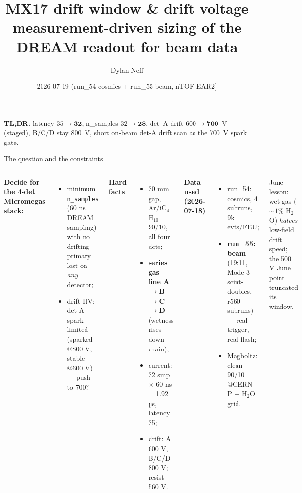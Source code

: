 \documentclass[10pt,aspectratio=169]{beamer}
\title{\textbf{MX17 drift window \& drift voltage}\\
\large measurement-driven sizing of the DREAM readout for beam data}
\author{Dylan Neff}
\date{2026-07-19 \quad (run\_54 cosmics + run\_55 beam, nTOF EAR2)}
\begin{document}
\begin{frame}
  \titlepage
  \vfill
  \centering\small
  \textbf{TL;DR:}\; latency $35\to\mathbf{32}$,\; n\_samples $32\to\mathbf{28}$,\;
  det~A drift $600\to\mathbf{700}$~V (staged),\; B/C/D stay 800~V,\;
  short on-beam det-A drift scan as the 700~V spark gate.
\end{frame}

\begin{frame}{The question and the constraints}
  \begin{columns}[T]
    \textbf{Decide for the 4-det Micromegas stack:}
    \begin{itemize}
      \item minimum \texttt{n\_samples} (60 ns DREAM sampling) with no drifting primary lost on \emph{any} detector;
      \item drift HV: det A spark-limited (sparked @800 V, stable @600 V) --- push to 700?
    \end{itemize}
    \vspace{0.5em}
    \textbf{Hard facts}
    \begin{itemize}
      \item 30 mm gap, Ar/iC$_4$H$_{10}$ 90/10, all four dets;
      \item \textbf{series gas line A$\to$B$\to$C$\to$D} (wetness rises down-chain);
      \item current: 32 smp $\times$ 60 ns = 1.92 µs, latency 35;
      \item drift: A 600 V, B/C/D 800 V; resist 560 V.
    \end{itemize}
    \textbf{Data used (2026-07-18)}
    \begin{itemize}
      \item run\_54: cosmics, 4 subruns, 9k evts/FEU;
      \item \textbf{run\_55: beam} (19:11, Mode-3 scint-doubles, r560 subruns) --- real trigger, real flash;
      \item Magboltz: clean 90/10 @CERN P + H$_2$O grid.
    \end{itemize}
    \vspace{0.5em}
    \small June lesson: wet gas (${\sim}1\%$ H$_2$O) \emph{halves} low-field drift speed; the 500 V June point truncated its window.
  \end{columns}
\end{frame}
\end{document}
